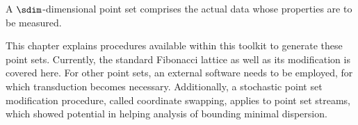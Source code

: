 
A $\sdim$-dimensional point set comprises the actual data whose properties are to be measured.

This chapter explains procedures available within this toolkit to generate these point sets. Currently, the standard Fibonacci lattice as well as its modification is covered here. For other point sets, an external software needs to be employed, for which transduction becomes necessary. Additionally, a stochastic point set modification procedure, called coordinate swapping, applies to point set streams, which showed potential in helping analysis of bounding minimal dispersion.

\clearpage
